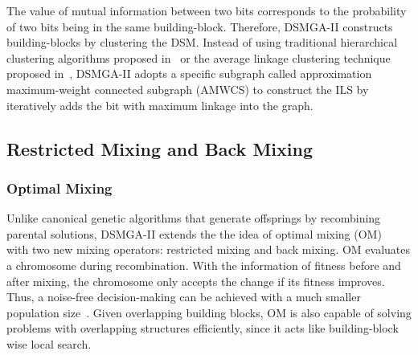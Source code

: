 \documentclass{sig-alternate-05-2015}
\begin{document}
The value of mutual information between two bits corresponds to the probability of two bits being in the same building-block.
Therefore, DSMGA-II constructs building-blocks by clustering the DSM.
Instead of using traditional hierarchical clustering algorithms proposed in~\cite{thierens:LTGA} or the average linkage clustering technique proposed in~\cite{thierens:OM}, DSMGA-II adopts a specific subgraph called approximation maximum-weight connected subgraph (AMWCS) to construct the ILS by iteratively adds the bit with maximum linkage into the graph.






\subsection{Restricted Mixing and Back Mixing}

\subsubsection{Optimal Mixing}
Unlike canonical genetic algorithms that generate offsprings by recombining parental solutions, DSMGA-II extends the the idea of optimal mixing (OM)~\cite{thierens:OM} with two new mixing operators: restricted mixing and back mixing. OM evaluates a chromosome during recombination. With the information of fitness before and after mixing, the chromosome only accepts the change if its fitness improves. Thus, a noise-free decision-making can be achieved with a much smaller population size~\cite{goldberg:buildingblock}. Given overlapping building blocks, OM is also capable of solving problems with overlapping structures efficiently, since it acts like building-block wise local search.
\end{document}
